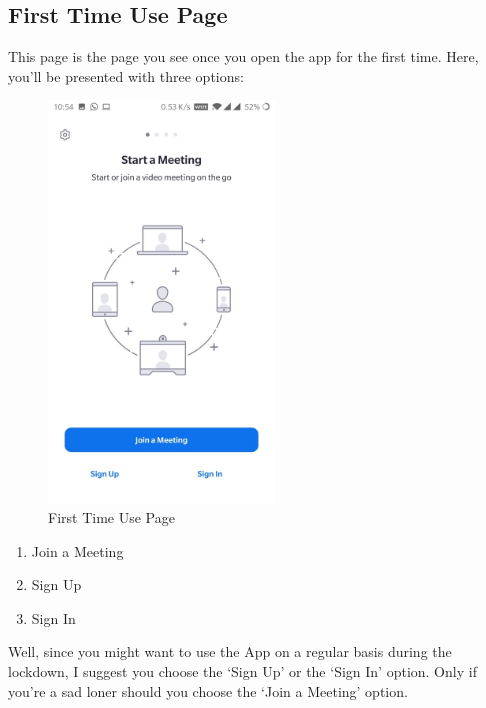 \documentclass[14pt]{report}
\begin{document}
                    \subsection{First Time Use Page}
                        This page is the page you see once you open the app for the first time. Here, you'll be presented with three options:
                        \begin{figure}[H]
                            \includegraphics[width=6cm]{LandPage.jpeg}
                            \centering
                            \caption{First Time Use Page}
                            \label{fig:LandPage}
                        \end{figure}
                        \begin{enumerate}
                            \item Join a Meeting
                            \item Sign Up
                            \item Sign In
                        \end{enumerate}

                        Well, since you might want to use the App on a regular basis during the lockdown, I suggest you choose the `Sign Up' or the `Sign In' option. Only if you're a sad loner should you choose the `Join a Meeting' option.\\
\end{document}
